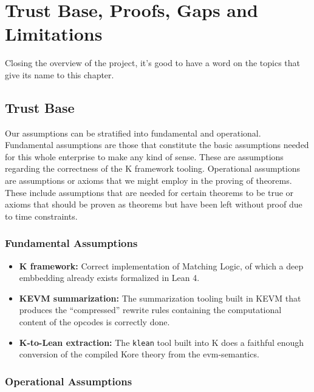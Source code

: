 \chapter{Trust Base, Proofs, Gaps and Limitations}

Closing the overview of the project, it's good to have a word on the topics that give its name to this chapter.

\section{Trust Base}

Our assumptions can be stratified into fundamental and operational.
Fundamental assumptions are those that constitute the basic assumptions needed for this whole enterprise to make any kind of sense. These are assumptions regarding the correctness of the K framework tooling.
Operational assumptions are assumptions or axioms that we might employ in the proving of theorems. These include assumptions that are needed for certain theorems to be true or axioms that should be proven as theorems but have been left without proof due to time constraints.

\subsection{Fundamental Assumptions}

\begin{itemize}
\item \textbf{K framework:} Correct implementation of Matching Logic, of which a deep embbedding already exists formalized in Lean 4.
\item \textbf{KEVM summarization:} The summarization tooling built in KEVM that produces the ``compressed'' rewrite rules containing the computational content of the opcodes is correctly done.
\item \textbf{K-to-Lean extraction:} The \texttt{klean} tool built into K does a faithful enough conversion of the compiled Kore theory from the evm-semantics.
\end{itemize}

\subsection{Operational Assumptions}

